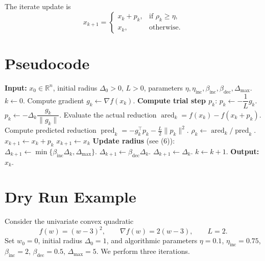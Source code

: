 \documentclass[11pt]{article}
\begin{document}
The iterate update is
\[
x_{k+1}= 
\begin{cases}
x_{k}+p_{k}, & \text{if }\rho_{k}\ge\eta,\\
x_{k}, & \text{otherwise}.
\end{cases}
\tag{7}
\]

\section{Pseudocode}
\label{sec:pseudocode}
\begin{algorithm}[H]
\caption{Convex Trust‑Region Method (CTR)}
\begin{algorithmic}[1]
\State \textbf{Input:} $x_{0}\in\mathbb{R}^{n}$, initial radius $\Delta_{0}>0$, 
$L>0$, parameters $\eta,\eta_{\text{inc}},\beta_{\text{inc}},\beta_{\text{dec}},\Delta_{\max}$.
\State $k\gets0$.
    \State Compute gradient $g_{k}\gets\nabla f(x_{k})$.
    \State \textbf{Compute trial step $p_{k}$}:
        \State $p_{k}\gets -\dfrac{1}{L}g_{k}$.
    \Else
        \State $p_{k}\gets -\Delta_{k}\dfrac{g_{k}}{\|g_{k}\|}$.
    \EndIf
    \State Evaluate the actual reduction 
    $\operatorname{ared}_{k}=f(x_{k})-f(x_{k}+p_{k})$.
    \State Compute predicted reduction 
    $\operatorname{pred}_{k}= -g_{k}^{\!\top}p_{k}-\frac{L}{2}\|p_{k}\|^{2}$.
    \State $\rho_{k}\gets\operatorname{ared}_{k}/\operatorname{pred}_{k}$.
        \State $x_{k+1}\gets x_{k}+p_{k}$ 
    \Else
        \State $x_{k+1}\gets x_{k}$ 
    \EndIf
    \State \textbf{Update radius} (see (6)):
        \State $\Delta_{k+1}\gets\min\{\beta_{\text{inc}}\Delta_{k},\Delta_{\max}\}$.
        \State $\Delta_{k+1}\gets\beta_{\text{dec}}\Delta_{k}$.
    \Else
        \State $\Delta_{k+1}\gets\Delta_{k}$.
    \EndIf
    \State $k\gets k+1$.
\EndWhile
\State \textbf{Output:} $x_{k}$.
\end{algorithmic}
\end{algorithm}
\section{Dry Run Example}
\label{sec:dryrun}
Consider the univariate convex quadratic
\[
f(w)=(w-3)^{2},
\qquad \nabla f(w)=2(w-3),\qquad L=2.
\]
Set $w_{0}=0$, initial radius $\Delta_{0}=1$, and algorithmic parameters
$\eta=0.1$, $\eta_{\text{inc}}=0.75$, $\beta_{\text{inc}}=2$, $\beta_{\text{dec}}=0.5$,
$\Delta_{\max}=5$.
We perform three iterations.
\end{document}
